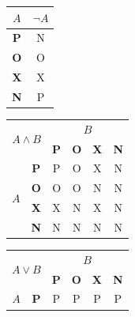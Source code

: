 \documentclass[11pt]{article}
\begin{document}
\begin{table}[h]
    \centering
    \begin{tabular}{|c|c|}
        \hline
        $A$        & $\neg A$ \\
        \hline
        \textbf{P} & N        \\
        \hline
        \textbf{O} & O        \\
        \hline
        \textbf{X} & X        \\
        \hline
        \textbf{N} & P        \\
        \hline
    \end{tabular}
    \begin{tabular}{|c|c|c|c|c|c|}
        \hline
        \multicolumn{2}{|c|}{\multirow{2}{*}{$A \wedge B$}} & \multicolumn{4}{c|}{$B$}                                            \\
        \cline{3-6}
        \multicolumn{2}{|c|}{}                              & \textbf{P}               & \textbf{O} & \textbf{X} & \textbf{N}     \\
        \hline
        \multirow{4}{*}{$A$}                                & \textbf{P}               & P          & O          & X          & N \\
        \cline{2-6}
                                                            & \textbf{O}               & O          & O          & N          & N \\
        \cline{2-6}
                                                            & \textbf{X}               & X          & N          & X          & N \\
        \cline{2-6}
                                                            & \textbf{N}               & N          & N          & N          & N \\
        \hline
    \end{tabular}
    \begin{tabular}{|c|c|c|c|c|c|}
        \hline
        \multicolumn{2}{|c|}{\multirow{2}{*}{$A \vee B$}} & \multicolumn{4}{c|}{$B$}                                            \\
        \cline{3-6}
        \multicolumn{2}{|c|}{}                            & \textbf{P}               & \textbf{O} & \textbf{X} & \textbf{N}     \\
        \hline
        \multirow{4}{*}{$A$}                              & \textbf{P}               & P          & P          & P          & P \\
        \cline{2-6}

\end{tabular}
\end{table}
\end{document}

